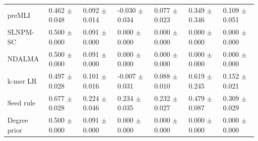 \begin{landscape}
{\begin{longtable}{lllllll}
preMLI & 0.462 $\pm$ 0.048 & 0.092 $\pm$ 0.014 & -0.030 $\pm$ 0.034 & 0.077 $\pm$ 0.023 & 0.349 $\pm$ 0.346 & 0.109 $\pm$ 0.051 \\
SLNPM-SC & 0.500 $\pm$ 0.000 & 0.091 $\pm$ 0.000 & 0.000 $\pm$ 0.000 & 0.000 $\pm$ 0.000 & 0.000 $\pm$ 0.000 & 0.000 $\pm$ 0.000 \\
NDALMA & 0.500 $\pm$ 0.000 & 0.091 $\pm$ 0.000 & 0.000 $\pm$ 0.000 & 0.000 $\pm$ 0.000 & 0.000 $\pm$ 0.000 & 0.000 $\pm$ 0.000 \\
k-mer LR & 0.497 $\pm$ 0.028 & 0.101 $\pm$ 0.016 & -0.007 $\pm$ 0.031 & 0.088 $\pm$ 0.010 & 0.619 $\pm$ 0.245 & 0.152 $\pm$ 0.021 \\
Seed rule & 0.677 $\pm$ 0.028 & 0.224 $\pm$ 0.046 & 0.234 $\pm$ 0.035 & 0.232 $\pm$ 0.027 & 0.479 $\pm$ 0.087 & 0.309 $\pm$ 0.029 \\
Degree prior & 0.500 $\pm$ 0.000 & 0.091 $\pm$ 0.000 & 0.000 $\pm$ 0.000 & 0.000 $\pm$ 0.000 & 0.000 $\pm$ 0.000 & 0.000 $\pm$ 0.000 \\
\end{longtable}
}
\end{landscape}
